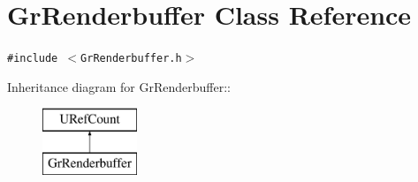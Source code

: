 \hypertarget{class_gr_renderbuffer}{
\section{GrRenderbuffer Class Reference}
\label{class_gr_renderbuffer}
}
{\tt \#include $<$GrRenderbuffer.h$>$}

Inheritance diagram for GrRenderbuffer::\begin{figure}[H]
\begin{center}
\leavevmode
\includegraphics[height=2cm]{class_gr_renderbuffer}
\end{center}
\end{figure}

